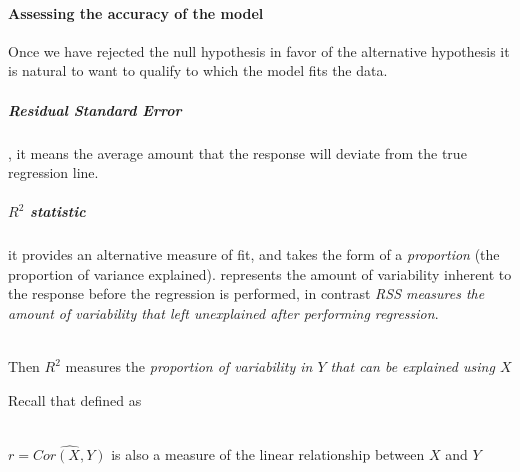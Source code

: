 \paragraph{Assessing the accuracy of the model}
Once we have rejected the null hypothesis in favor of the alternative
hypothesis it is natural to want to qualify to which the model fits the
data.
\subparagraph{Residual Standard Error} , it means the average amount that the response
will deviate from the true regression line.
\subparagraph{$R^{2}$ statistic} it provides an alternative measure of
fit, and takes the form of a \emph{proportion} (the proportion of
variance explained).   represents the amount of 
variability
inherent to the response before the regression is performed, in 
contrast \emph{RSS measures the amount of variability that left
unexplained after performing regression}. \begin{center}\\Then $R^{2}$ measures the \emph{proportion of
variability in $Y$ that can be explained using $X$}\end{center}Recall
that  defined as \begin{center}\\$r=\widehat{Cor\left(X,Y\right)}$ is also a measure of the linear
relationship between $X$ and $Y$\end{center}
